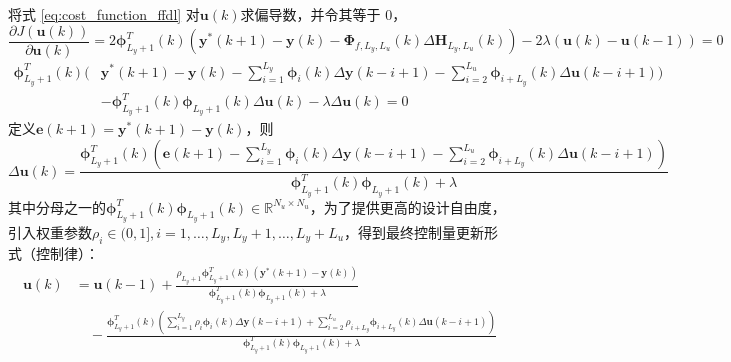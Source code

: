       将式 \eqref{eq:cost_function_ffdl} 对$\boldsymbol{u}(k)$求偏导数，并令其等于 0，
      \begin{equation}
      \frac{\partial J(\boldsymbol{u}(k))}{\partial \boldsymbol{u}(k)} = 2 \boldsymbol{\phi}_{L_y+1}^T(k) \left( \boldsymbol{y}^*(k + 1) - \boldsymbol{y}(k) - \boldsymbol{\Phi}_{f,L_y,L_u}(k) \Delta \boldsymbol{H}_{L_y,L_u}(k) \right) - 2\lambda (\boldsymbol{u}(k) - \boldsymbol{u}(k - 1)) = 0
      \label{eq:derivative_zero}
      \end{equation}
      \begin{equation}
      \begin{aligned}
      \boldsymbol{\phi}_{L_y+1}^T(k) \Bigg( &\boldsymbol{y}^*(k + 1) - \boldsymbol{y}(k) - \sum_{i=1}^{L_y} \boldsymbol{\phi}_i(k) \Delta \boldsymbol{y}(k - i + 1) - \sum_{i=2}^{L_u} \boldsymbol{\phi}_{i+L_y}(k) \Delta \boldsymbol{u}(k - i + 1) \Bigg) \\
      &- \boldsymbol{\phi}_{L_y+1}^T(k) \boldsymbol{\phi}_{L_y+1}(k) \Delta \boldsymbol{u}(k) - \lambda \Delta \boldsymbol{u}(k) = 0
      \end{aligned}
      \label{eq:derivative_expanded}
      \end{equation}
      定义$\boldsymbol{e}(k + 1) = \boldsymbol{y}^*(k + 1) - \boldsymbol{y}(k)$，则
      \begin{equation}
      \Delta \boldsymbol{u}(k) = \frac{\boldsymbol{\phi}_{L_y+1}^T(k) \left( \boldsymbol{e}(k + 1) - \sum_{i=1}^{L_y} \boldsymbol{\phi}_i(k) \Delta \boldsymbol{y}(k - i + 1) - \sum_{i=2}^{L_u} \boldsymbol{\phi}_{i+L_y}(k) \Delta \boldsymbol{u}(k - i + 1) \right)}{\boldsymbol{\phi}_{L_y+1}^T(k) \boldsymbol{\phi}_{L_y+1}(k) + \lambda}
      \label{eq:control_increment}
      \end{equation}
      其中分母之一的$\boldsymbol{\phi}_{L_y+1}^T(k) \boldsymbol{\phi}_{L_y+1}(k) \in \mathbb{R}^{N_u \times N_u}$，为了提供更高的设计自由度，引入权重参数$\rho_i \in (0,1], i = 1,\dots,L_y, L_y + 1,\dots,L_y + L_u$，得到最终控制量更新形式（控制律）：
      \begin{equation}
      \begin{aligned}
      \boldsymbol{u}(k) &= \boldsymbol{u}(k - 1) + \frac{\rho_{L_y+1} \boldsymbol{\phi}_{L_y+1}^T(k) \left( \boldsymbol{y}^*(k + 1) - \boldsymbol{y}(k) \right)}{\boldsymbol{\phi}_{L_y+1}^T(k) \boldsymbol{\phi}_{L_y+1}(k) + \lambda} \\
      &\quad - \frac{\boldsymbol{\phi}_{L_y+1}^T(k) \left( \sum_{i=1}^{L_y} \rho_i \boldsymbol{\phi}_i(k) \Delta \boldsymbol{y}(k - i + 1) + \sum_{i=2}^{L_u} \rho_{i+L_y} \boldsymbol{\phi}_{i+L_y}(k) \Delta \boldsymbol{u}(k - i + 1) \right)}{\boldsymbol{\phi}_{L_y+1}^T(k) \boldsymbol{\phi}_{L_y+1}(k) + \lambda}
      \end{aligned}
      \label{eq:control_law}
      \end{equation}
